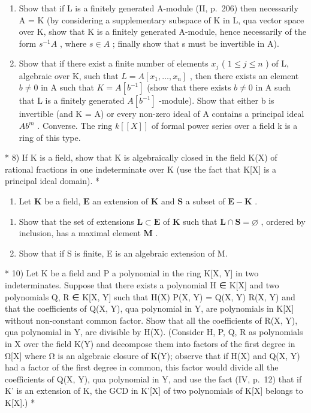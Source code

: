 \begin{enumerate}
\def\labelenumi{\alph{enumi})}
\item
  Show that if L is a finitely generated A-module (II, p.~206) then necessarily A = K (by considering a supplementary subspace of K in L, qua vector space over K, show that K is a finitely generated A-module, hence necessarily of the form \(s^{-1}A\) , where \(s \in A\) ; finally show that s must be invertible in A).
\item
  Show that if there exist a finite number of elements \(x_{j}\) ( \(1 \leqslant j \leqslant n\) ) of L, algebraic over K, such that \(L = A[x_{1}, \ldots, x_{n}]\) , then there exists an element \(b \neq 0\) in A such that \(K = A[b^{-1}]\) (show that there exists \(b \neq 0\) in A such that L is a finitely generated \(A[b^{-1}]\) -module). Show that either b is invertible (and K = A) or every non-zero ideal of A contains a principal ideal \(Ab^{m}\) . Converse. The ring \(k[[X]]\) of formal power series over a field k is a ring of this type.
\end{enumerate}

* 8) If K is a field, show that K is algebraically closed in the field K(X) of rational fractions in one indeterminate over K (use the fact that K{[}X{]} is a principal ideal domain). *

\begin{enumerate}
\def\labelenumi{\arabic{enumi})}
\setcounter{enumi}{8}
\tightlist
\item
  Let \(\mathbf{K}\) be a field, \(\mathbf{E}\) an extension of \(\mathbf{K}\) and \(\mathbf{S}\) a subset of \(\mathbf{E} - \mathbf{K}\) .
\end{enumerate}

\begin{enumerate}
\def\labelenumi{\alph{enumi})}
\item
  Show that the set of extensions \(\mathbf{L} \subset \mathbf{E}\) of \(\mathbf{K}\) such that \(\mathbf{L} \cap \mathbf{S} = \varnothing\) , ordered by inclusion, has a maximal element \(\mathbf{M}\) .
\item
  Show that if S is finite, E is an algebraic extension of M.
\end{enumerate}

* 10) Let K be a field and P a polynomial in the ring K{[}X, Y{]} in two indeterminates. Suppose that there exists a polynomial H ∈ K{[}X{]} and two polynomials Q, R ∈ K{[}X, Y{]} such that H(X) P(X, Y) = Q(X, Y) R(X, Y) and that the coefficients of Q(X, Y), qua polynomial in Y, are polynomials in K{[}X{]} without non-constant common factor. Show that all the coefficients of R(X, Y), qua polynomial in Y, are divisible by H(X). (Consider H, P, Q, R as polynomials in X over the field K(Y) and decompose them into factors of the first degree in Ω{[}X{]} where Ω is an algebraic closure of K(Y); observe that if H(X) and Q(X, Y) had a factor of the first degree in common, this factor would divide all the coefficients of Q(X, Y), qua polynomial in Y, and use the fact (IV, p.~12) that if K' is an extension of K, the GCD in K'{[}X{]} of two polynomials of K{[}X{]} belongs to K{[}X{]}.) *

